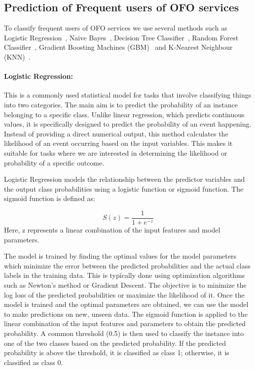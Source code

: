 \documentclass[a4paper,fleqn]{cas-sc}
\begin{document}
\subsection{Prediction of Frequent users of OFO services}

To classify frequent users of OFO services we use several methods such as Logistic Regression~\cite{cox1958regression}, Naive Bayes~\cite{naive_bayes}, Decision Tree Classifier~\cite{decision_tree}, Random Forest Classifier~\cite{random_forest}, Gradient Boosting Machines (GBM)~\cite{gbm} and K-Nearest Neighbour (KNN)~\cite{knn}. 


\paragraph{Logistic Regression:}
This is a commonly used statistical model for tasks that involve classifying things into two categories. The main aim is to predict the probability of an instance belonging to a specific class. Unlike linear regression, which predicts continuous values, it is specifically designed to predict the probability of an event happening. Instead of providing a direct numerical output, this method calculates the likelihood of an event occurring based on the input variables. This makes it suitable for tasks where we are interested in determining the likelihood or probability of a specific outcome. 

Logistic Regression models the relationship between the predictor variables and the output class probabilities using a logistic function or sigmoid function. The sigmoid function is defined as:

\begin{equation}
    S(z) = \frac{1}{1 + e^{-z}}
\end{equation}
Here, z represents a linear combination of the input features and model parameters. 

The model is trained by finding the optimal values for the model parameters which minimize the error between the predicted probabilities and the actual class labels in the training data. This is typically done using optimization algorithms such as Newton's method or Gradient Descent. The objective is to minimize the log loss of the predicted probabilities or maximize the likelihood of it. Once the model is trained and the optimal parameters are obtained, we can use the model to make predictions on new, unseen data. The sigmoid function is applied to the linear combination of the input features and parameters to obtain the predicted probability. A common threshold (0.5) is then used to classify the instance into one of the two classes based on the predicted probability. If the predicted probability is above the threshold, it is classified as class 1; otherwise, it is classified as class 0. 
\end{document}
